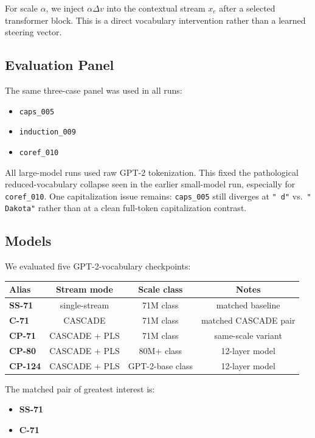 \documentclass[11pt]{article}
\begin{document}
For scale $\alpha$, we inject $\alpha \Delta v$ into the contextual stream
$x_e$ after a selected transformer block. This is a direct vocabulary
intervention rather than a learned steering vector.

\subsection{Evaluation Panel}

The same three-case panel was used in all runs:
\begin{itemize}[leftmargin=1.5em]
\item \texttt{caps\_005}
\item \texttt{induction\_009}
\item \texttt{coref\_010}
\end{itemize}

All large-model runs used raw GPT-2 tokenization. This fixed the pathological
reduced-vocabulary collapse seen in the earlier small-model run, especially for
\texttt{coref\_010}. One capitalization issue remains: \texttt{caps\_005}
still diverges at \texttt{" d"} vs.\ \texttt{" Dakota"} rather than at a clean
full-token capitalization contrast.

\subsection{Models}

We evaluated five GPT-2-vocabulary checkpoints:

\begin{center}
\begin{tabular}{lccc}
\toprule
Alias & Stream mode & Scale class & Notes \\
\midrule
\textbf{SS-71} & single-stream & 71M class & matched baseline \\
\textbf{C-71} & CASCADE & 71M class & matched CASCADE pair \\
\textbf{CP-71} & CASCADE + PLS & 71M class & same-scale variant \\
\textbf{CP-80} & CASCADE + PLS & 80M+ class & 12-layer model \\
\textbf{CP-124} & CASCADE + PLS & GPT-2-base class & 12-layer model \\
\bottomrule
\end{tabular}
\end{center}

The matched pair of greatest interest is:
\begin{itemize}[leftmargin=1.5em]
\item \textbf{SS-71}
\item \textbf{C-71}
\end{itemize}
\end{document}
